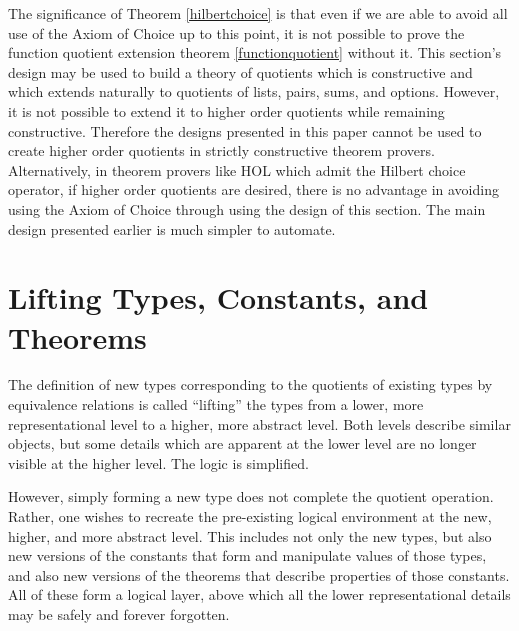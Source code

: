 \documentclass[envcountsame,runningheads]{llncs}
\begin{document}
\vspace{2.0mm}
The significance of Theorem \ref{hilbertchoice}
is that even if we are able to avoid all use of the Axiom of Choice up to
this point, it is not possible to prove the function quotient extension
theorem \ref{functionquotient} without it.  
This section's design may be used
to build a theory of quotients which is constructive and which extends
naturally to quotients of lists, pairs, sums, and options.
However, it is not possible
to extend it to higher order quotients while remaining constructive. 
Therefore
the designs presented in this paper cannot be used to create higher order
quotients in strictly constructive theorem provers. 
Alternatively, in theorem
provers like HOL which admit the Hilbert choice operator,
if higher order quotients are desired,
there is no advantage in avoiding using the Axiom of Choice 
through using the design of this section.
The main design presented earlier is much simpler to automate.


\vfill
\pagebreak[4]
%
\section{Lifting Types, Constants, and Theorems}
%
\label{liftingall}

The definition of new types corresponding to the quotients of
existing types by equivalence relations is called ``lifting''
the types from a lower, more representational level to a higher,
more abstract level.  Both levels describe similar objects, but
some details which are apparent at the lower level are no longer
visible at the higher level.  The logic is simplified.

However, simply forming a new type does not complete the quotient operation.
Rather, one wishes to recreate the 
pre-existing logical environment at the new,
higher, and more abstract level.  This includes not only the new
types, but also new versions of the constants that form and 
manipulate values of those types, and also new versions of the
theorems that describe properties of those constants.  All of these
form a logical layer, above which all the lower representational details
may be safely and forever forgotten.

%
\end{document}
